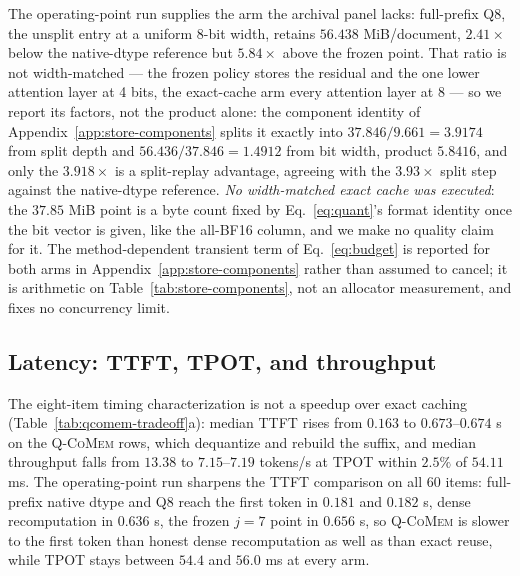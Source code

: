 \documentclass{article}
\newcommand{\qcomem}{\textsc{Q-CoMem}}
\begin{document}
The operating-point run supplies the arm the archival panel lacks: full-prefix
Q8, the unsplit entry at a uniform 8-bit width, retains $56.438$ MiB/document,
$2.41\times$ below the native-dtype reference but $5.84\times$ above the frozen
point.  That ratio is not width-matched --- the frozen policy stores the residual
and the one lower attention layer at 4 bits, the exact-cache arm every attention
layer at 8 --- so we report its factors, not the product alone: the
component identity of Appendix~\ref{app:store-components} splits it exactly into
$37.846/9.661=3.9174$ from split depth and $56.436/37.846=1.4912$ from bit
width, product $5.8416$, and only the $3.918\times$ is a split-replay advantage,
agreeing with the $3.93\times$ split step against the native-dtype reference.
\emph{No width-matched exact cache was executed}: the $37.85$ MiB point is a byte
count fixed by Eq.~\ref{eq:quant}'s format identity once the bit vector is given,
like the all-BF16 column, and we make no quality claim for it.  The method-dependent transient term of
Eq.~\ref{eq:budget} is reported for both arms in
Appendix~\ref{app:store-components} rather than assumed to cancel; it is
arithmetic on Table~\ref{tab:store-components}, not an allocator measurement, and
fixes no concurrency limit.



\subsection{Latency: TTFT, TPOT, and throughput}
\label{sec:latency}



The eight-item timing characterization is not a speedup over exact caching
(Table~\ref{tab:qcomem-tradeoff}a): median TTFT rises from $0.163$ to
$0.673$--$0.674$ s on the \qcomem{} rows, which dequantize and rebuild the
suffix, and median throughput falls from $13.38$ to $7.15$--$7.19$ tokens/s at
TPOT within $2.5\%$ of $54.11$ ms.  The operating-point run sharpens the TTFT
comparison on all 60 items: full-prefix native dtype and Q8 reach the first
token in $0.181$ and $0.182$ s, dense recomputation in $0.636$ s, the frozen
$j=7$ point in $0.656$ s, so \qcomem{} is slower to the first token than honest
dense recomputation as well as than exact reuse, while TPOT stays between $54.4$
and $56.0$ ms at every arm.
\end{document}
